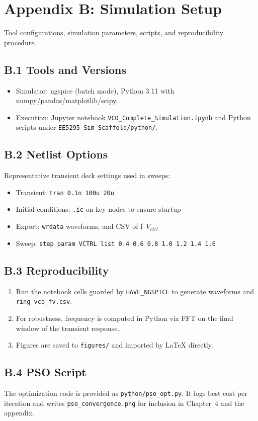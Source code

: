 \chapter{Appendix B: Simulation Setup}
Tool configurations, simulation parameters, scripts, and reproducibility procedure.

\section*{B.1 Tools and Versions}
\begin{itemize}
  \item Simulator: ngspice (batch mode), Python 3.11 with numpy/pandas/matplotlib/scipy.
  \item Execution: Jupyter notebook \texttt{VCO\_Complete\_Simulation.ipynb} and Python scripts under \texttt{EE5295\_Sim\_Scaffold/python/}.
\end{itemize}

\section*{B.2 Netlist Options}
Representative transient deck settings used in sweeps:
\begin{itemize}
  \item Transient: \texttt{tran 0.1n 100u 20u}
  \item Initial conditions: \texttt{.ic} on key nodes to ensure startup
  \item Export: \texttt{wrdata} waveforms, and CSV of f--\(V_{ctrl}\)
  \item Sweep: \texttt{step param VCTRL list 0.4 0.6 0.8 1.0 1.2 1.4 1.6}
\end{itemize}

\section*{B.3 Reproducibility}
\begin{enumerate}
  \item Run the notebook cells guarded by \texttt{HAVE\_NGSPICE} to generate waveforms and \texttt{ring\_vco\_fv.csv}.
  \item For robustness, frequency is computed in Python via FFT on the final window of the transient response.
  \item Figures are saved to \texttt{figures/} and imported by LaTeX directly.
\end{enumerate}

\section*{B.4 PSO Script}
The optimization code is provided as \texttt{python/pso\_opt.py}. It logs best cost per iteration and writes \texttt{pso\_convergence.png} for inclusion in Chapter~4 and the appendix.

